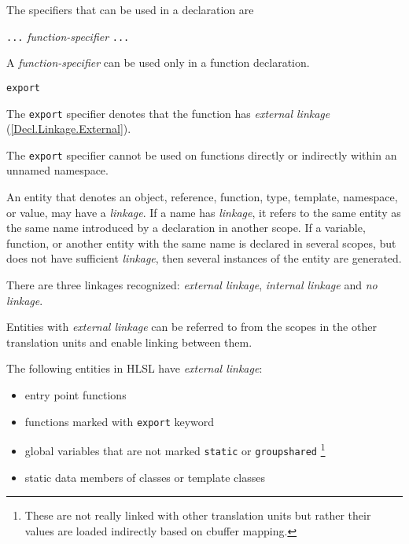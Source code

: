 \p The specifiers that can be used in a declaration are
\begin{grammar}
  \br
  \texttt{...}\br
  \textit{function-specifier}\br
  \texttt{...}
\end{grammar}


\p A \textit{function-specifier} can be used only in a function declaration.

\begin{grammar}
  \br
  \texttt{export}\br
\end{grammar}

\p The \texttt{export} specifier denotes that the function has \textit{external linkage} (\ref{Decl.Linkage.External}).

\p The \texttt{export} specifier cannot be used on functions directly or indirectly within an unnamed namespace.


\p An entity that denotes an object, reference, function, type, template, namespace, or value, may have a \textit{linkage}. If a name has \textit{linkage}, it refers to the same entity as the same name introduced by a declaration in another scope. If a variable, function, or another entity with the same name is declared in several scopes, but does not have sufficient \textit{linkage}, then several instances of the entity are generated.

\p There are three linkages recognized: \textit{external linkage}, \textit{internal linkage} and \textit{no linkage}.


\p Entities with \textit{external linkage} can be referred to from the scopes in the other translation units and enable linking between them.

\p The following entities in HLSL have \textit{external linkage}:
\begin{itemize}
  \item entry point functions
  \item functions marked with \texttt{export} keyword
  \item global variables that are not marked \texttt{static} or \texttt{groupshared} \footnote{These are not really linked with other translation units but rather their values are loaded indirectly based on cbuffer mapping.}
  \item static data members of classes or template classes
\end{itemize}

